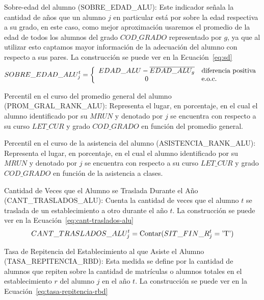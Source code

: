 \begin{longdescription}
\begin{longdescription}
              \item[Sobre-edad del alumno] (SOBRE\_EDAD\_ALU): Este indicador señala la cantidad de años que un alumno $j$ en particular está por sobre la edad respectiva a su grado, en este caso, como mejor aproximación usaremos el promedio de la edad de todos los alumnos del grado $COD\_GRADO$ representado por $g$, ya que al utilizar esto captamos mayor información de la adecuación del alumno con respecto a sus pares.%
              La construcción se puede ver en la Ecuación~\ref{eq:sd}
              \begin{equation}
              \centering
              SOBRE\_EDAD\_ALU_{j}^{t} = \left\{
                \begin{array}{c l}
                 EDAD\_ALU -\overline{EDAD\_ALU_g} & \mbox{diferencia positiva}\\
                 0 & \mbox{e.o.c.}
                \end{array}
                \right.
                \label{eq:sd}
              \end{equation}
              \item[Percentil en el curso del promedio general del alumno] (PROM\_GRAL\_RANK\_ALU): Representa el lugar, en porcentaje, en el cual el alumno identificado por su $MRUN$ y denotado por $j$ se encuentra con respecto a su curso $LET\_CUR$ y grado $COD\_GRADO$ en función del promedio general.
              \item[Percentil en el curso de la asistencia del alumno](ASISTENCIA\_RANK\_ALU): Representa el lugar, en porcentaje, en el cual el alumno identificado por su $MRUN$ y denotado por $j$ se encuentra con respecto a su curso $LET\_CUR$ y grado $COD\_GRADO$ en función de la asistencia a clases.
              \item[Cantidad de Veces que el Alumno se Traslada Durante el Año](CANT\_TRASLADOS\_ALU):
             Cuenta la cantidad de veces que el alumno $t$ se traslada de un establecimiento a otro durante el año $t$. La construcción se puede ver en la Ecuación~\ref{eq:cant-traslados-alu}
            \begin{equation}
              \centering
              CANT\_TRASLADOS\_ALU_{j}^{t} = \mbox{Contar}(SIT\_FIN\_R_{j}^{t} = \mbox{'T'})
                \label{eq:cant-traslados-alu}
              \end{equation}
              \item[Tasa de Repitencia del Establecimiento al que Asiste el Alumno](TASA\_REPITENCIA\_RBD): Esta medida se define por la cantidad de alumnos que repiten sobre la cantidad de matrículas o alumnos totales en el establecimiento $r$ del alumno $j$ en el año $t$. La construcción se puede ver en la Ecuación~\ref{eq:tasa-repitencia-rbd}

\end{longdescription}
\end{longdescription}
